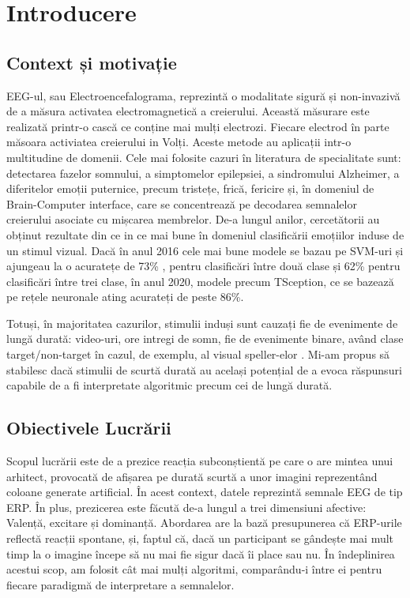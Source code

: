 \chapter{Introducere}

\section{Context și motivație}
EEG-ul, sau Electroencefalograma, reprezintă o modalitate sigură și non-invazivă de a măsura activatea electromagnetică a creierului. Această măsurare este realizată printr-o cască ce conține mai mulți electrozi. Fiecare electrod în parte măsoara activiatea creierului in Volți. Aceste metode au aplicații intr-o multitudine de domenii. Cele mai folosite cazuri în literatura de specialitate sunt: detectarea fazelor somnului, a simptomelor epilepsiei, a sindromului Alzheimer, a diferitelor emoții puternice, precum tristețe, frică, fericire și, în domeniul de Brain-Computer interface, care se concentrează pe decodarea semnalelor creierului asociate cu mișcarea membrelor.
De-a lungul anilor, cercetătorii au obținut rezultate din ce in ce mai bune în domeniul clasificării emoțiilor induse de un stimul vizual. Dacă în anul 2016 cele mai bune modele se bazau pe SVM-uri și ajungeau la o acuratețe de 73\% \cite{ATKINSON201635}, pentru clasificări între două clase și 62\% pentru clasificări între trei clase, în anul 2020, modele precum TSception, ce se bazează pe rețele neuronale ating acurateți de peste 86\%\cite{TSception}. 

Totuși, în majoritatea cazurilor, stimulii induși sunt cauzați fie de evenimente de lungă durată: video-uri, ore intregi de somn, fie de evenimente binare, având clase target/non-target în cazul, de exemplu, al visual speller-elor \cite{visual_speller}. Mi-am propus să stabilesc dacă stimulii de scurtă durată au același potențial de a evoca răspunsuri capabile de a fi interpretate algoritmic precum cei de lungă durată.

\section{Obiectivele Lucrării}
Scopul lucrării este de a prezice reacția subconștientă pe care o are mintea unui arhitect, provocată de afișarea pe durată scurtă a unor imagini reprezentând coloane generate artificial. În acest context, datele reprezintă semnale EEG de tip ERP. În plus, prezicerea este făcută de-a lungul a trei dimensiuni afective: Valență, excitare și dominanță. Abordarea are la bază presupunerea că ERP-urile reflectă reacții spontane, și, faptul că, dacă un participant se gândește mai mult timp la o imagine începe să nu mai fie sigur dacă îi place sau nu. În îndeplinirea acestui scop, am folosit cât mai mulți algoritmi, comparându-i între ei pentru fiecare paradigmă de interpretare a semnalelor.

